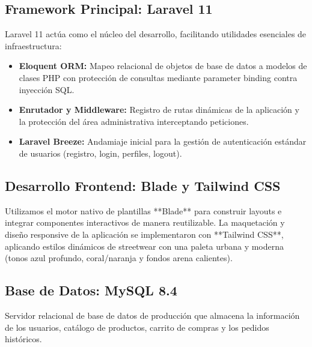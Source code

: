 \subsection{Framework Principal: Laravel 11}
Laravel 11 actúa como el núcleo del desarrollo, facilitando utilidades esenciales de infraestructura:
\begin{itemize}
    \item \textbf{Eloquent ORM:} Mapeo relacional de objetos de base de datos a modelos de clases PHP con protección de consultas mediante parameter binding contra inyección SQL.
    \item \textbf{Enrutador y Middleware:} Registro de rutas dinámicas de la aplicación y la protección del área administrativa interceptando peticiones.
    \item \textbf{Laravel Breeze:} Andamiaje inicial para la gestión de autenticación estándar de usuarios (registro, login, perfiles, logout).
\end{itemize}

\subsection{Desarrollo Frontend: Blade y Tailwind CSS}
Utilizamos el motor nativo de plantillas **Blade** para construir layouts e integrar componentes interactivos de manera reutilizable. La maquetación y diseño responsive de la aplicación se implementaron con **Tailwind CSS**, aplicando estilos dinámicos de streetwear con una paleta urbana y moderna (tonos azul profundo, coral/naranja y fondos arena calientes).

\subsection{Base de Datos: MySQL 8.4}
Servidor relacional de base de datos de producción que almacena la información de los usuarios, catálogo de productos, carrito de compras y los pedidos históricos.
